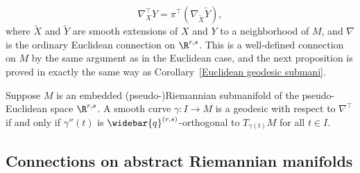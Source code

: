 \[\nabla^{\top}_XY=\pi^{\top}(\nabla_{\widetilde{X}}\widetilde{Y}),\]
where $\widetilde{X}$ and $\widetilde{Y}$ are smooth extensions of $X$ and $Y$ to a neighborhood of $M$, and $\nabla$ is the ordinary Euclidean connection on $\R^{r,s}$. This is a well-defined connection on $M$ by the same argument as in the Euclidean case, and the next proposition is proved in exactly the same way as Corollary~\ref{Euclidean geodesic submani}.
\begin{proposition}
Suppose $M$ is an embedded (pseudo-)Riemannian submanifold of the pseudo-Euclidean space $\R^{r,s}$. A smooth curve $\gamma:I\to M$ is a geodesic with 
respect to $\nabla^{\top}$ if and only if $\gamma''(t)$ is $\widebar{q}^{(r,s)}$-orthogonal to $T_{\gamma(t)}M$ for all $t\in I$.
\end{proposition}
\subsection{Connections on abstract Riemannian manifolds}
